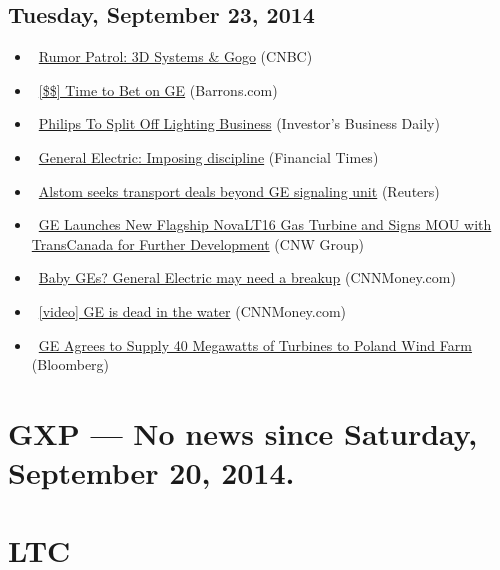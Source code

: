 \documentclass[11pt,asymmetric]{article}
\begin{document}
\subsection*{Tuesday, September 23, 2014}
\begin{itemize}
\item\ \href{http://finance.yahoo.com/video/rumor-patrol-3d-systems-gogo-212500790.html}{Rumor Patrol: 3D Systems \& Gogo} (CNBC)
\item\ \href{http://online.barrons.com/article/SB52784017629588234037504580172303586456916.html?mod=yahoobarrons&ru=yahoo}{[\$\$] Time to Bet on GE} (Barrons.com)
\item\ \href{http://news.investors.com/092314-718567-Philips-split-follows-ge-and-siemens-examples.htm?ven=yahoocp&src=aurlled&ven=yahoo}{Philips To Split Off Lighting Business} (Investor's Business Daily)
\item\ \href{http://www.ft.com/cms/s/ca40a3a4-432e-11e4-9a58-00144feabdc0,s01=1.html}{General Electric: Imposing discipline} (Financial Times)
\item\ \href{http://finance.yahoo.com/news/alstom-seeks-transport-deals-beyond-164358301.html}{Alstom seeks transport deals beyond GE signaling unit} (Reuters)
\item\ \href{http://finance.yahoo.com/news/ge-launches-flagship-novalt16-gas-160000278.html}{GE Launches New Flagship NovaLT16 Gas Turbine and Signs MOU with TransCanada for Further Development} (CNW Group)
\item\ \href{http://money.cnn.com/2014/09/23/investing/general-electric-stock-ge/index.html?source=yahoo_quote}{Baby GEs? General Electric may need a breakup} (CNNMoney.com)
\item\ \href{http://money.cnn.com/video/investing/2014/09/23/ge-needs-a-change-to-return-to-glory-days.cnnmoney}{[video] GE is dead in the water} (CNNMoney.com)
\item\ \href{http://www.bloomberg.com/news/2014-09-23/ge-agrees-to-supply-40-megawatts-of-turbines-to-poland-wind-farm.html?cmpid=yhoo}{GE Agrees to Supply 40 Megawatts of Turbines to Poland Wind Farm} (Bloomberg)
\end{itemize}

\section*{GXP --- No news since Saturday, September 20, 2014.}


\section*{LTC}
\end{document}
